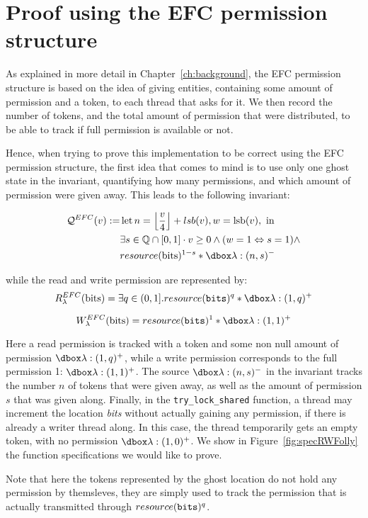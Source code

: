 \section{Proof using the EFC permission structure}
As explained in more detail in Chapter~\ref{ch:background}, the EFC permission structure is based on the idea of giving entities, containing some amount of permission and a token, to each thread that asks for it. We then record the number of tokens, and the total amount of permission that were distributed, to be able to track if full permission is available or not. 

Hence, when trying to prove this implementation to be correct using the EFC permission structure, the first idea that comes to mind is to use only one ghost state in the invariant, quantifying how many permissions, and which amount of permission were given away. This leads to the following invariant:

$$\begin{aligned} \mathcal{Q}^{EFC}(v) :=& \operatorname{let} n=\left\lfloor\frac{v}{4}\right\rfloor + lsb(v), w=\operatorname{lsb}(v), \text { in } \\ & \exists s \in \mathbb{Q} \cap[0,1] \cdot v \geq 0 \wedge (w=1 \Leftrightarrow s=1) \wedge \\ & resource(\mathrm{bits})^{1-s} * \ghost{\lambda :(n, s)^{-}}
\end{aligned} $$

while the read and write permission are represented by:
$$\rPerm = \exists q \in (0, 1].\ress{q}* \ghost{\lambda : (1, q)^+}$$

$$\wPerm = \ress{1} * \ghost{\lambda:(1, 1)^+}$$

Here a read permission is tracked with a token and some non null amount of permission $\ghost{\lambda :(1, q)^+}$, while a write permission corresponds to the full permission 1: $\ghost{\lambda:(1, 1)^+}$. The source $\ghost{\lambda :(n, s)^{-}}$ in the invariant tracks the number $n$ of tokens that were given away, as well as the amount of permission $s$ that was given along. Finally, in the \texttt{try\_lock\_shared} function, a thread may increment the location \emph{bits} without actually gaining any permission, if there is already a writer thread along. In this case, the thread temporarily gets an empty token, with no permission $\ghost{\lambda:(1, 0)^+}$.  We show in Figure~\ref{fig:specRWFolly} the function specifications we would like to prove. 

Note that here the tokens represented by the ghost location do not hold any permission by themsleves, they are simply used to track the permission that is actually transmitted through $resource(\texttt{bits})^{q}$.


